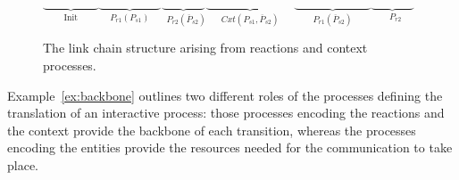 \begin{example}
\begin{figure}[t]
  $
  \underbrace{\phantom{loremipsu}}_\text{Init}   \underbrace{\phantom{loremipsuo}}_\text{$P_{r1} (P_{s1})$} \underbrace{\phantom{loremip}}_\text{ $P_{r2}(\overline{P}_{s2})$}\underbrace{\phantom{loremipsumlore}}_\text{$Cxt (P_{s1},\overline{P}_{s2})$}
     \underbrace{\phantom{loremipsumlo}}_\text{$P_{r1} (\overline{P}_{s2})$}
      \underbrace{\phantom{loremip}}_\text{ $P_{r2}$}
  $
  \caption{The link chain structure arising from reactions and context processes.}
   \label{fig:backbone}
 \end{figure}
 \end{example}

Example~\ref{ex:backbone}   outlines two different roles of the processes defining the translation of an interactive process: those processes encoding the reactions and the context provide the backbone of each transition, whereas the processes encoding the entities provide the resources needed for the communication to take place.

